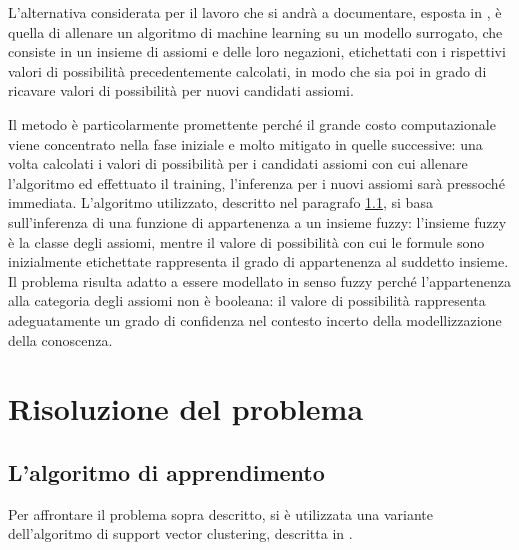 \documentclass[12pt,a4paper]{report}
\begin{document}
L'alternativa considerata per il lavoro che si andrà a documentare, esposta in \cite{sacpaper}, è quella di allenare un algoritmo di machine learning su un modello surrogato, che consiste in un insieme di assiomi e delle loro negazioni, etichettati con i rispettivi valori di possibilità precedentemente calcolati, in modo che sia poi in grado di ricavare valori di possibilità per nuovi candidati assiomi.


Il metodo è particolarmente promettente perché il grande costo computazionale viene concentrato nella fase iniziale e molto mitigato in quelle successive: una volta calcolati i valori di possibilità per i candidati assiomi con cui allenare l'algoritmo ed effettuato il training, l'inferenza per i nuovi assiomi sarà pressoché immediata.
L'algoritmo utilizzato, descritto nel paragrafo \ref{algorithmParagraph}, si basa sull'inferenza di una funzione di appartenenza a un insieme fuzzy: l'insieme fuzzy è la classe degli assiomi, mentre il valore di possibilità con cui le formule sono inizialmente etichettate rappresenta il grado di appartenenza al suddetto insieme.
Il problema risulta adatto a essere modellato in senso fuzzy perché l'appartenenza alla categoria degli assiomi non è booleana: il valore di possibilità rappresenta adeguatamente un grado di confidenza nel contesto incerto della modellizzazione della conoscenza.

\chapter{Risoluzione del problema}
\section{L'algoritmo di apprendimento}\label{algorithmParagraph}
Per affrontare il problema sopra descritto, si è utilizzata una variante dell'algoritmo di support vector clustering, descritta in \cite{svpaper}.
\end{document}
